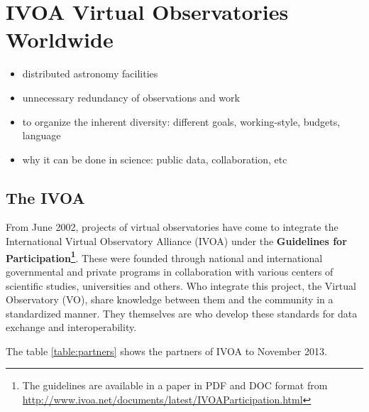 \section{IVOA Virtual Observatories Worldwide}


\begin{itemize}
\item distributed astronomy facilities
\item unnecessary redundancy of observations and work
\end{itemize}


\begin{itemize}
\item to organize the inherent diversity: different goals, working-style, budgets, language
\item why it can be done in science: public data, collaboration, etc
\end{itemize}


\subsection{The IVOA}

From June 2002, projects of virtual observatories have come to integrate the
International Virtual Observatory Alliance (IVOA) under the \textbf{Guidelines
for Participation\footnote{The guidelines are available in a paper in PDF and
DOC format from
\url{http://www.ivoa.net/documents/latest/IVOAParticipation.html}}}. These were
founded through national and international governmental and private programs in
collaboration with various centers of scientific studies, universities and
others. Who integrate this project, the Virtual Observatory (VO), share
knowledge between them and the community in a standardized manner. They
themselves are who develop these standards for data exchange and
interoperability. 




The table \ref{table:partners} shows the partners of IVOA to
November 2013.\\

